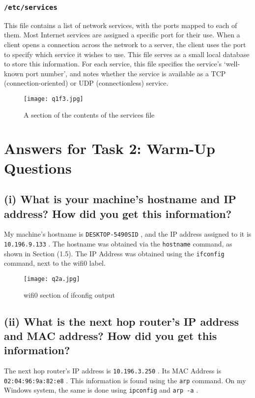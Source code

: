 \documentclass{article}
\let\oldtexttt\texttt
\renewcommand{\texttt}[1]{
  \colorbox{bgcolor}{\oldtexttt{#1}}
  }
\begin{document}
\subsubsection{\texttt{/etc/services}}
This file contains a list of network services, with the ports mapped to each of them. Most Internet services are assigned a specific port for their use. When a client opens a connection across the network to a server, the client uses the port to specify which service it wishes to use. This file serves as a small local database to store this information. For each service, this file specifies the service’s `well-known port number', and notes whether the service is available as a TCP (connection-oriented) or UDP (connectionless) service.

\begin{figure}[!hbt]
    \centering
    \texttt{[image: q1f3.jpg]}
    \caption{A section of the contents of the services file}
    \label{fig:my_label1f3}
\end{figure}

\newpage
\section{Answers for Task 2: Warm-Up Questions}
\subsection*{(i) What is your machine's hostname and IP address? How did you get this information?}
My machine's hostname is \texttt{DESKTOP-5490SID}, and the IP address assigned to it is \texttt{10.196.9.133}. The hostname was obtained via the \texttt{hostname} command, as shown in Section (1.5). The IP Address was obtained using the \texttt{ifconfig} command, next to the wifi0 label.

\begin{figure}[!hbt]
    \centering
    \texttt{[image: q2a.jpg]}
    \caption{wifi0 section of ifconfig output}
    \label{fig:my_label2a}
\end{figure}

\subsection*{(ii) What is the next hop router's IP address and MAC address? How did you get this information?}
The next hop router's IP address is \texttt{10.196.3.250}. Its MAC Address is \texttt{02:04:96:9a:82:e8}. This information is found using the \texttt{arp} command. On my Windows system, the same is done using \texttt{ipconfig} and \texttt{arp -a}.
\end{document}
